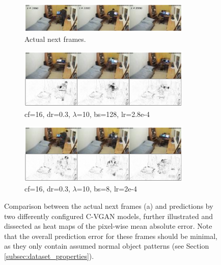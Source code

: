 \begin{figure}
  \centering

	\begin{subfigure}{\textwidth}
		\centering
		\includegraphics[width=0.9\textwidth]{graphics/eval/cvgan_2/qual_prediction/real/normal.pdf}
	  \caption{Actual next frames.}
	  \label{subfig:cvgan_prediction_normal}
	\end{subfigure}
	
	\begin{subfigure}{\textwidth}
	  \centering
		\includegraphics[width=0.9\textwidth]{graphics/eval/cvgan_2/qual_prediction/cvgan_2_dfilter-16_ddropout-0.3_lambda-10_batchsize-128_learningrate-0.000282842712474619_epochs-0050/normal.pdf}
		\caption{cf=16, dr=0.3, $\lambda$=10, bs=128, lr=2.8e-4}
		\label{subfig:bs128-pred-n}
	\end{subfigure}	
	
	\begin{subfigure}{\textwidth}
	  \centering
		\includegraphics[width=0.9\textwidth]{graphics/eval/cvgan_2/qual_prediction/cvgan_2_dfilter-16_ddropout-0.3_lambda-10_batchsize-8_learningrate-0.0002_epochs-0050/normal.pdf}
		\caption{cf=16, dr=0.3, $\lambda$=10, bs=8, lr=2e-4}
		\label{subfig:bs8-pred-n}
	\end{subfigure}
	
	\caption[Prediction error heat maps for normal frames predicted by C-VGANs.]{Comparison between the actual next frames (a) and predictions by two differently configured C-VGAN models, further illustrated and dissected as heat maps of the pixel-wise mean absolute error. Note that the overall prediction error for these frames should be minimal, as they only contain assumed normal object patterns (see Section \ref{subsec:dataset_properties}).}
	\label{fig:cvgan_prediction_normal}
\end{figure}

